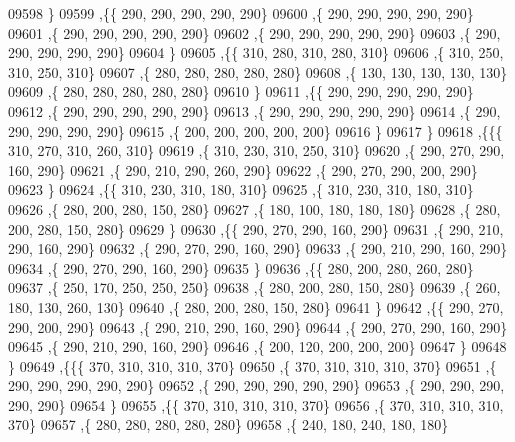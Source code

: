 \begin{DoxyCode}
09598     \}
09599    ,\{\{   290,   290,   290,   290,   290\}
09600     ,\{   290,   290,   290,   290,   290\}
09601     ,\{   290,   290,   290,   290,   290\}
09602     ,\{   290,   290,   290,   290,   290\}
09603     ,\{   290,   290,   290,   290,   290\}
09604     \}
09605    ,\{\{   310,   280,   310,   280,   310\}
09606     ,\{   310,   250,   310,   250,   310\}
09607     ,\{   280,   280,   280,   280,   280\}
09608     ,\{   130,   130,   130,   130,   130\}
09609     ,\{   280,   280,   280,   280,   280\}
09610     \}
09611    ,\{\{   290,   290,   290,   290,   290\}
09612     ,\{   290,   290,   290,   290,   290\}
09613     ,\{   290,   290,   290,   290,   290\}
09614     ,\{   290,   290,   290,   290,   290\}
09615     ,\{   200,   200,   200,   200,   200\}
09616     \}
09617    \}
09618   ,\{\{\{   310,   270,   310,   260,   310\}
09619     ,\{   310,   230,   310,   250,   310\}
09620     ,\{   290,   270,   290,   160,   290\}
09621     ,\{   290,   210,   290,   260,   290\}
09622     ,\{   290,   270,   290,   200,   290\}
09623     \}
09624    ,\{\{   310,   230,   310,   180,   310\}
09625     ,\{   310,   230,   310,   180,   310\}
09626     ,\{   280,   200,   280,   150,   280\}
09627     ,\{   180,   100,   180,   180,   180\}
09628     ,\{   280,   200,   280,   150,   280\}
09629     \}
09630    ,\{\{   290,   270,   290,   160,   290\}
09631     ,\{   290,   210,   290,   160,   290\}
09632     ,\{   290,   270,   290,   160,   290\}
09633     ,\{   290,   210,   290,   160,   290\}
09634     ,\{   290,   270,   290,   160,   290\}
09635     \}
09636    ,\{\{   280,   200,   280,   260,   280\}
09637     ,\{   250,   170,   250,   250,   250\}
09638     ,\{   280,   200,   280,   150,   280\}
09639     ,\{   260,   180,   130,   260,   130\}
09640     ,\{   280,   200,   280,   150,   280\}
09641     \}
09642    ,\{\{   290,   270,   290,   200,   290\}
09643     ,\{   290,   210,   290,   160,   290\}
09644     ,\{   290,   270,   290,   160,   290\}
09645     ,\{   290,   210,   290,   160,   290\}
09646     ,\{   200,   120,   200,   200,   200\}
09647     \}
09648    \}
09649   ,\{\{\{   370,   310,   310,   310,   370\}
09650     ,\{   370,   310,   310,   310,   370\}
09651     ,\{   290,   290,   290,   290,   290\}
09652     ,\{   290,   290,   290,   290,   290\}
09653     ,\{   290,   290,   290,   290,   290\}
09654     \}
09655    ,\{\{   370,   310,   310,   310,   370\}
09656     ,\{   370,   310,   310,   310,   370\}
09657     ,\{   280,   280,   280,   280,   280\}
09658     ,\{   240,   180,   240,   180,   180\}

\end{DoxyCode}
